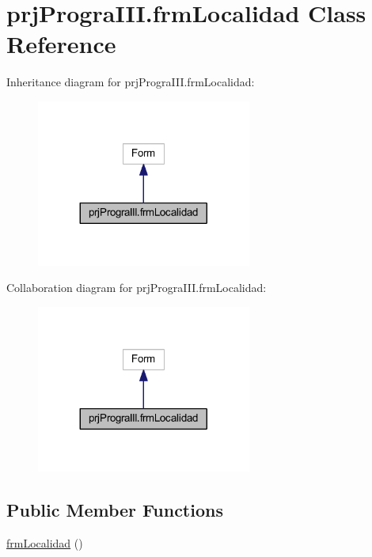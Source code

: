 \hypertarget{classprj_progra_i_i_i_1_1frm_localidad}{}\section{prj\+Progra\+I\+I\+I.\+frm\+Localidad Class Reference}
\label{classprj_progra_i_i_i_1_1frm_localidad}


Inheritance diagram for prj\+Progra\+I\+I\+I.\+frm\+Localidad\+:
\nopagebreak
\begin{figure}[H]
\begin{center}
\leavevmode
\includegraphics[width=200pt]{classprj_progra_i_i_i_1_1frm_localidad__inherit__graph}
\end{center}
\end{figure}


Collaboration diagram for prj\+Progra\+I\+I\+I.\+frm\+Localidad\+:
\nopagebreak
\begin{figure}[H]
\begin{center}
\leavevmode
\includegraphics[width=200pt]{classprj_progra_i_i_i_1_1frm_localidad__coll__graph}
\end{center}
\end{figure}
\subsection*{Public Member Functions}
\begin{DoxyCompactItemize}
\item 
\hyperlink{classprj_progra_i_i_i_1_1frm_localidad_ad5a3af80840dc9ea53d5bddc347a61eb}{frm\+Localidad} ()
\end{DoxyCompactItemize}
